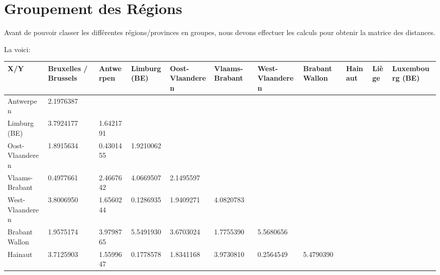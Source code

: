 \documentclass{article}
\begin{document}
\section{Groupement des Régions}
	Avant de pouvoir classer les différentes régions/provinces en groupes, nous devons effectuer les calculs pour obtenir la matrice des distances.
	
	La voici:
	
\begin{tabularx}{18.4cm}{|X|X|X|X|X|X|X|X|X|X|X|}
	\hline
	X/Y                      &Bruxelles / Brussels&Antwerpen &Limburg (BE) &Oost-Vlaanderen &Vlaams-Brabant &West-Vlaanderen &Brabant Wallon &Hainaut &Liège &Luxembourg (BE)\\
	\hline
	Antwerpen                           &2.1976387 &&&&&&&&&\\                                                                                                                             
	\hline
	Limburg (BE)                        &3.7924177       &1.6421791&&&&&&&&\\                                                                                                                                                         
	\hline
	Oost-Vlaanderen                     &1.8915634       &0.4301455          &1.9210062&&&&&&&\\                                                                                                                                      
	\hline
	Vlaams-Brabant                      &0.4977661       &2.4667642          &4.0669507             &2.1495597&&&&&&\\                                                                                                                
	\hline
	West-Vlaanderen                     &3.8006950       &1.6560244          &0.1286935             &1.9409271            &4.0820783 &&&&&\\                                                                                           
	\hline
	Brabant Wallon                      &1.9575174       &3.9798765          &5.5491930            & 3.6703024            &1.7755390             &5.5680656                                                                     &&&&\\
	\hline
	Hainaut                             &3.7125903       &1.5599647          &0.1778578            & 1.8341168            &3.9730810             &0.2564549            &5.4790390                                                &&&\\

\end{tabularx}
\end{document}
